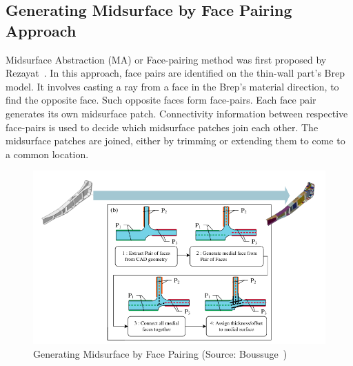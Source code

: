 
\subsection{Generating Midsurface by Face Pairing Approach}

Midsurface Abstraction (MA) or Face-pairing method was first proposed by Rezayat~\cite{Rezayat1996}. In this approach, face pairs are identified on the thin-wall part's Brep model. It involves casting a ray from a face in the Brep's material direction, to find the opposite face. Such opposite faces form face-pairs. Each face pair generates its own midsurface patch. Connectivity information between respective face-pairs is used to decide which midsurface patches join each other. The midsurface patches are joined, either by trimming or extending them to come to a common location.


	\begin{figure} [!h]
		\centering
		\includegraphics[width=\linewidth]{..//Common/images/manual}
		\caption{Generating Midsurface by Face Pairing (Source: Boussuge~\cite{Boussuge2014})}
		\label{fig:litsurvey:manual}
	\end{figure}
	
